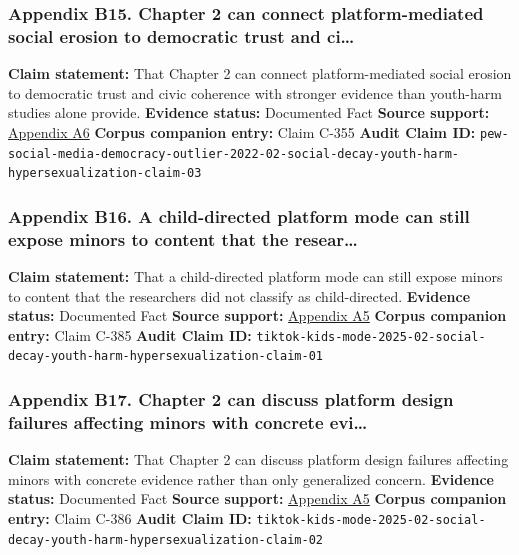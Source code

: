 \documentclass[
  american,
  11pt,
  letterpaper,
]{article}
\begin{document}
\subsubsection{Appendix B15. Chapter 2 can connect platform-mediated
social erosion to democratic trust and
ci\ldots{}}\label{ch-02-appendix-b15-chapter-2-can-connect-platform-mediated-social-erosion-to-democratic-trust-and-ci}

\textbf{Claim statement:} That Chapter 2 can connect platform-mediated
social erosion to democratic trust and civic coherence with stronger
evidence than youth-harm studies alone provide. \textbf{Evidence
status:} Documented Fact \textbf{Source support:}
\hyperref[ch-02-appendix-a6-social-media-seen-as-mostly-good-for-democracy-across-many-nations-but-u-s-is-a-major-outlier]{Appendix
A6} \textbf{Corpus companion entry:} Claim C-355 \textbf{Audit Claim
ID:}
\texttt{pew-social-media-democracy-outlier-2022-02-social-decay-youth-harm-hypersexualization-claim-03}

\subsubsection{Appendix B16. A child-directed platform mode can still
expose minors to content that the
resear\ldots{}}\label{ch-02-appendix-b16-a-child-directed-platform-mode-can-still-expose-minors-to-content-that-the-resear}

\textbf{Claim statement:} That a child-directed platform mode can still
expose minors to content that the researchers did not classify as
child-directed. \textbf{Evidence status:} Documented Fact \textbf{Source
support:}
\hyperref[ch-02-appendix-a5-when-kids-mode-isn-t-for-kids-investigating-tiktok-s-under-13-experience]{Appendix
A5} \textbf{Corpus companion entry:} Claim C-385 \textbf{Audit Claim
ID:}
\texttt{tiktok-kids-mode-2025-02-social-decay-youth-harm-hypersexualization-claim-01}

\subsubsection{Appendix B17. Chapter 2 can discuss platform design
failures affecting minors with concrete
evi\ldots{}}\label{ch-02-appendix-b17-chapter-2-can-discuss-platform-design-failures-affecting-minors-with-concrete-evi}

\textbf{Claim statement:} That Chapter 2 can discuss platform design
failures affecting minors with concrete evidence rather than only
generalized concern. \textbf{Evidence status:} Documented Fact
\textbf{Source support:}
\hyperref[ch-02-appendix-a5-when-kids-mode-isn-t-for-kids-investigating-tiktok-s-under-13-experience]{Appendix
A5} \textbf{Corpus companion entry:} Claim C-386 \textbf{Audit Claim
ID:}
\texttt{tiktok-kids-mode-2025-02-social-decay-youth-harm-hypersexualization-claim-02}
\end{document}
